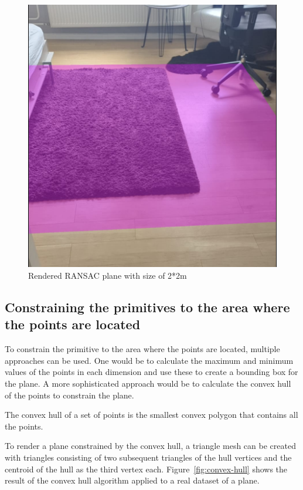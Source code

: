 \begin{figure}[ht!]
    \centering
    \includegraphics[width=0.6\linewidth]{images/renderedPlane}
    \caption{Rendered RANSAC plane with size of 2*2m}
\end{figure}

\subsection{Constraining the primitives to the area where the points are located}
To constrain the primitive to the area where the points are located, multiple approaches can be used.
One would be to calculate the maximum and minimum values of the points in each dimension and use these to create a bounding box for the plane.
A more sophisticated approach would be to calculate the convex hull of the points to constrain the plane.

The convex hull of a set of points is the smallest convex polygon that contains all the points. %

To render a plane constrained by the convex hull,
a triangle mesh can be created with triangles consisting of two subsequent triangles of the hull vertices and the centroid of the hull as the third vertex each.
Figure~\ref{fig:convex-hull} shows the result of the convex hull algorithm applied to a real dataset of a plane.

